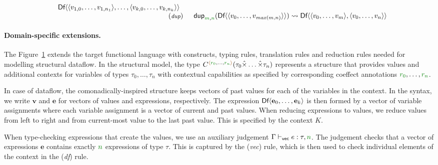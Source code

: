 \begin{figure}[t]
\begin{equation*}
\begin{array}{rl}
\begin{array}{l}
\\[-0.25em]
\quad \ident{Df}\langle\langle v_{1,0}, \ldots, v_{1, n_1} \rangle,\ldots,\langle v_{k,0}, \ldots, v_{k, n_k} \rangle\rangle
\end{array}
\\[0.25em]
{\footnotesize(\emph{dup})} & \begin{array}{l}
\ident{dup}_{\cclrd{m},\cclrd{n}} (\ident{Df}\langle\langle v_0, \ldots, v_{\mathit{max}(m,n)} \rangle\rangle) \rightsquigarrow
  \ident{Df}\langle\langle v_0, \ldots, v_m \rangle, \langle v_0, \ldots, v_n \rangle\rangle
\end{array}
\end{array}
\end{equation*}

\label{fig:structural-ext-df}
\end{figure}


\paragraph{Domain-specific extensions.}

The Figure~\ref{fig:structural-ext-df} extends the target functional language with constructs,
typing rules, translation rules and reduction rules needed for modelling structural dataflow.
In the structural model, the type $\ctyp{\alift{\cclrd{r_0}, \ldots, \cclrd{r_n}}}{(\tau_0\xtimes\ldots\xtimes\tau_n)}$
represents a structure that provides values and additional contexts for variables of types
$\tau_0,\ldots,\tau_n$ with contextual capabilities as specified by corresponding coeffect annotations
$\cclrd{r_0}, \ldots, \cclrd{r_n}$.

In case of dataflow, the comonadically-inspired structure keeps vectors of past values for each of
the variables in the context. In the syntax, we write $\textbf{v}$ and $\textbf{e}$ for vectors of
values and expressions, respectively. The expression $\textnormal{\sffamily Df}\langle \textbf{e}_0, \ldots, \textbf{e}_k \rangle$
is then formed by a vector of variable assignments where each variable assignment is a vector
of current and past values. When reducing expressions to values, we reduce values from left to
right and from current-most value to the last past value. This is specified by the context $K$.

When type-checking expressions that create the  values, we use an auxiliary judgement
$\Gamma \vdash_{\ident{vec}} e : \tau, \cclrd{n}$. The judgement checks that a vector of expressions
$\textbf{e}$ contains exactly $\cclrd{n}$ expressions of type $\tau$. This is captured by the
(\emph{vec}) rule, which is then used to check individual elements of the context in the
(\emph{df}) rule.

